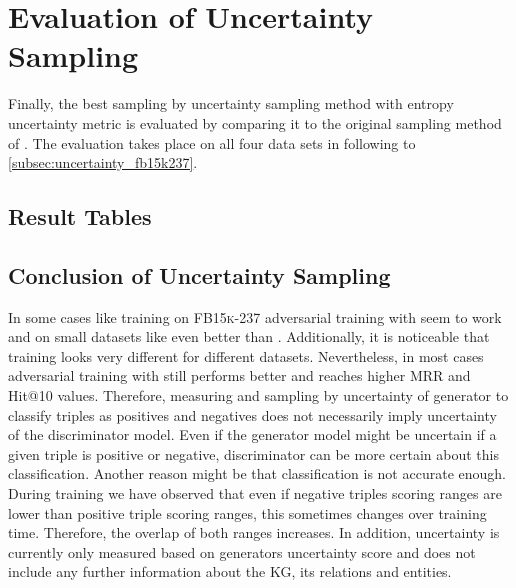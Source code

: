 \section{Evaluation of Uncertainty Sampling}
\label{ch:evaluation:sec:evaluation_uncertainty}

Finally, the best sampling by uncertainty sampling method \ussoftmax with entropy uncertainty metric is evaluated by comparing it to the original sampling method \origsampling of \kbgan.
The evaluation takes place on all four data sets in following  to \ref{subsec:uncertainty_fb15k237}.









\subsection{Result Tables}





\subsection{Conclusion of Uncertainty Sampling}
In some cases like training on \textsc{FB15k-237} adversarial training with \ussoftmax seem to work and on small datasets like \umls even better than \origsampling.
Additionally, it is noticeable that training looks very different for different datasets.
Nevertheless, in most cases adversarial training with \origsampling still performs better and reaches higher MRR and Hit@10 values.
Therefore, measuring and sampling by uncertainty of generator to classify triples as positives and negatives does not necessarily imply uncertainty of the discriminator model.
Even if the generator model might be uncertain if a given triple is positive or negative, discriminator can be more certain about this classification.
Another reason might be that classification is not accurate enough.
During training we have observed that even if negative triples scoring ranges are lower than positive triple scoring ranges, this sometimes changes over training time.
Therefore, the overlap of both ranges increases.
In addition, uncertainty is currently only measured based on generators uncertainty score and does not include any further information about the \ac{KG}, its relations and entities.


